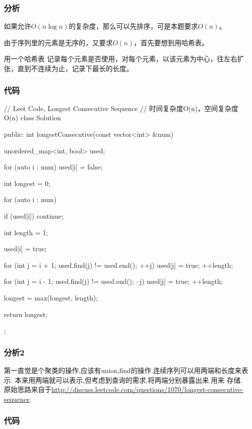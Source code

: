 \subsubsection{分析}
如果允许$O(n \log n)$的复杂度，那么可以先排序，可是本题要求$O(n)$。

由于序列里的元素是无序的，又要求$O(n)$，首先要想到用哈希表。

用一个哈希表 记录每个元素是否使用，对每个元素，以该元素为中心，往左右扩张，直到不连续为止，记录下最长的长度。


\subsubsection{代码}
\begin{Code}
// Leet Code, Longest Consecutive Sequence
// 时间复杂度O(n)，空间复杂度O(n)
class Solution {
public:
    int longestConsecutive(const vector<int> &num) {
        unordered_map<int, bool> used;

        for (auto i : num) used[i] = false;

        int longest = 0;

        for (auto i : num) {
            if (used[i]) continue;

            int length = 1;

            used[i] = true;

            for (int j = i + 1; used.find(j) != used.end(); ++j) {
                used[j] = true;
                ++length;
            }

            for (int j = i - 1; used.find(j) != used.end(); --j) {
                used[j] = true;
                ++length;
            }

            longest = max(longest, length);
        }

        return longest;
    }
};
\end{Code}

\subsubsection{分析2}
第一直觉是个聚类的操作,应该有union,find的操作.连续序列可以用两端和长度来表示.
本来用两端就可以表示,但考虑到查询的需求,将两端分别暴露出来.用来
存储.原始思路来自于\url{http://discuss.leetcode.com/questions/1070/longest-consecutive-sequence}

\subsubsection{代码}

